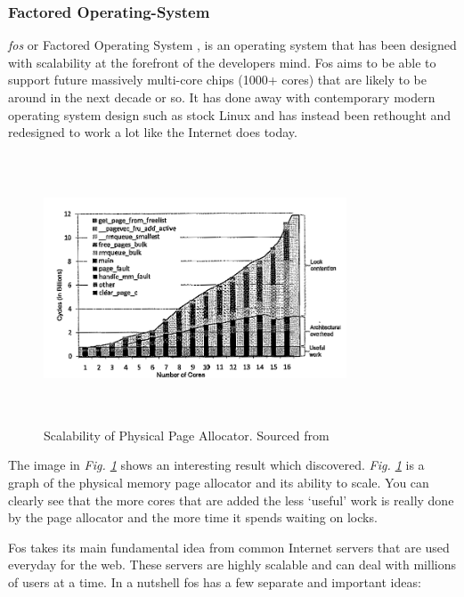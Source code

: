\documentclass[journal]{IEEEtran}
\begin{document}
\subsubsection{Factored Operating-System}

\emph{fos} or Factored Operating System \cite{fos}, is an operating system that has been designed with scalability at the forefront of the developers mind. Fos aims to be able to support future massively multi-core chips (1000+ cores) that are likely to be around in the next decade or so. It has done away with contemporary modern operating system design such as stock Linux and has instead been rethought and redesigned to work a lot like the Internet does today.

\begin{figure}
\includegraphics[width =9cm, height =8cm]{page_allocator.png}
\caption{Scalability of Physical Page Allocator. Sourced from \cite{fos}}
\label{PageAllocator}
\end{figure}

The image in \emph{Fig. \ref{PageAllocator}} shows an interesting result which \cite{fos} discovered. \emph{Fig. \ref{PageAllocator}} is a graph of the physical memory page allocator and its ability to scale. You can clearly see that the more cores that are added the less `useful' work is really done by the page allocator and the more time it spends waiting on locks. 

Fos takes its main fundamental idea from common Internet servers that are used everyday for the web. These servers are highly scalable and can deal with millions of users at a time. In a nutshell fos has a few separate and important ideas:

\vspace{2 mm}
\end{document}
